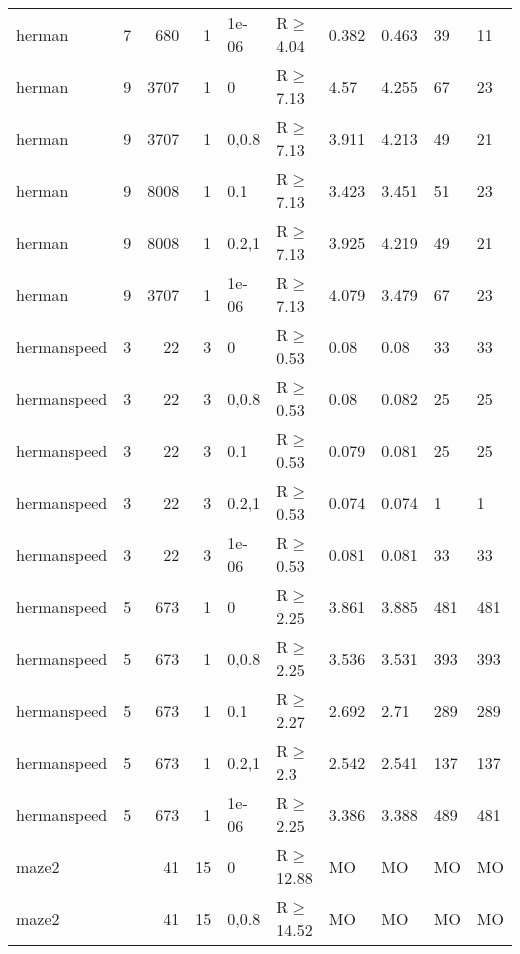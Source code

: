 \begin{longtable}{llrrllllll}
 herman        & 7        &    	680 &   1 & 1e-06 & R$\geq$4.04  & 0.382   & 0.463   & 39      & 11   \\
 herman        & 9        &   	3707 &   1 & 0     & R$\geq$7.13  & 4.57    & 4.255   & 67      & 23   \\
 herman        & 9        &   	3707 &   1 & 0,0.8 & R$\geq$7.13  & 3.911   & 4.213   & 49      & 21   \\
 herman        & 9        &   	8008 &   1 & 0.1   & R$\geq$7.13  & 3.423   & 3.451   & 51      & 23   \\
 herman        & 9        &   	8008 &   1 & 0.2,1 & R$\geq$7.13  & 3.925   & 4.219   & 49      & 21   \\
 herman        & 9        &   	3707 &   1 & 1e-06 & R$\geq$7.13  & 4.079   & 3.479   & 67      & 23   \\
 hermanspeed   & 3        &     	22 &   3 & 0     & R$\geq$0.53  & 0.08    & 0.08    & 33      & 33   \\
 hermanspeed   & 3        &     	22 &   3 & 0,0.8 & R$\geq$0.53  & 0.08    & 0.082   & 25      & 25   \\
 hermanspeed   & 3        &     	22 &   3 & 0.1   & R$\geq$0.53  & 0.079   & 0.081   & 25      & 25   \\
 hermanspeed   & 3        &     	22 &   3 & 0.2,1 & R$\geq$0.53  & 0.074   & 0.074   & 1       & 1    \\
 hermanspeed   & 3        &     	22 &   3 & 1e-06 & R$\geq$0.53  & 0.081   & 0.081   & 33      & 33   \\
 hermanspeed   & 5        &    	673 &   1 & 0     & R$\geq$2.25  & 3.861   & 3.885   & 481     & 481  \\
 hermanspeed   & 5        &    	673 &   1 & 0,0.8 & R$\geq$2.25  & 3.536   & 3.531   & 393     & 393  \\
 hermanspeed   & 5        &    	673 &   1 & 0.1   & R$\geq$2.27  & 2.692   & 2.71    & 289     & 289  \\
 hermanspeed   & 5        &    	673 &   1 & 0.2,1 & R$\geq$2.3   & 2.542   & 2.541   & 137     & 137  \\
 hermanspeed   & 5        &    	673 &   1 & 1e-06 & R$\geq$2.25  & 3.386   & 3.388   & 489     & 481  \\
 maze2         &          &     	41 &  15 & 0     & R$\geq$12.88 & MO      & MO      & MO      & MO   \\
 maze2         &          &     	41 &  15 & 0,0.8 & R$\geq$14.52 & MO      & MO      & MO      & MO   \\

\end{longtable}
